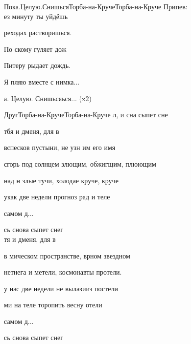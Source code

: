 \documentclass[11pt,a5paper]{book}
\begin{document}
\begin{song}{Пока.Целую.Снишься}{}{Торба-на-Круче}{Торба-на-Круче}{}{}
Припев:\\

ез минуту ты уйдёшь \par
{}реходах растворишься.\par 
По скому гуляет дож\par
Питеру рыдает дождь.\par 
Я пляю вместе с нимка... \par
{}а. Целую. Снишьсяься... (x2)\\

\end{song}


\begin{song}{Друг}{}{Торба-на-Круче}{Торба-на-Круче}{}{}
л, и сна сыпет сне\par 
{} тбя и дменя, для в\par 
{} вспесков пустыни, не узн им его имя\par
{} сгорь под солнцем злющим, обжигщим, плюющим\par
{} над н злые тучи, холодае круче, круче\par
{} укак две недели прогноз рад и теле\par
{} самом д...\par
\noindent{}сь снова сыпет снег \\

 тя и дменя, для в \par
{} в мическом пространстве, врном звездном \par
{} нетнега и метели, космонавты протели.\par
{} у нас  две недели не вылазииз постели\par
{}ми на теле торопить весну отели \par
{} самом д...\par
\noindent{}сь снова сыпет снег \\


\end{song}
\end{document}
